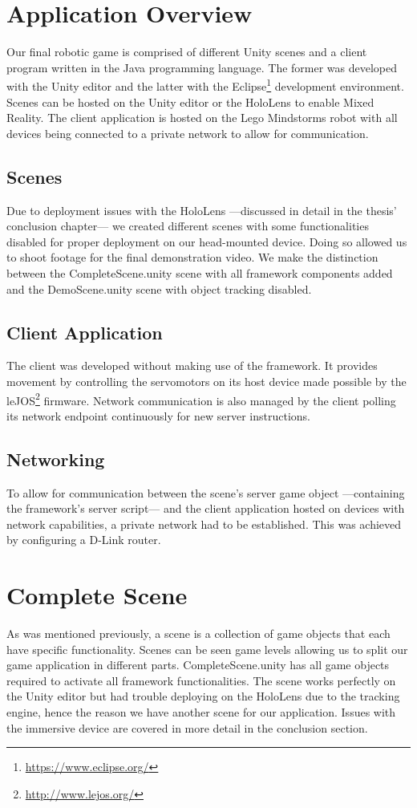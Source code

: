 \newpage
\section{Application Overview}
Our final robotic game is comprised of different Unity scenes and a client program written in the Java programming language. The former was developed with the Unity editor and the latter with the Eclipse\footnote{\protect\url{https://www.eclipse.org/}} development environment. Scenes can be hosted on the Unity editor or the HoloLens to enable Mixed Reality. The client application is hosted on the Lego Mindstorms robot with all devices being connected to a private network to allow for communication.

\subsection{Scenes}
Due to deployment issues with the HoloLens ---discussed in detail in the thesis' conclusion chapter--- we created different scenes with some functionalities disabled for proper deployment on our head-mounted device. Doing so allowed us to shoot footage for the final demonstration video. We make the distinction between the CompleteScene.unity scene with all framework components added and the DemoScene.unity scene with object tracking disabled.

\subsection{Client Application}
The client was developed without making use of the framework. It provides movement by controlling the servomotors on its host device made possible by the leJOS\footnote{\protect\url{http://www.lejos.org/}} firmware. Network communication is also managed by the client polling its network endpoint continuously for new server instructions.

\subsection{Networking}
To allow for communication between the scene's server game object ---containing the framework's server script--- and the client application hosted on devices with network capabilities, a private network had to be established. This was achieved by configuring a D-Link router.

\newpage

\section{Complete Scene}
As was mentioned previously, a scene is a collection of game objects that each have specific functionality. Scenes can be seen game levels allowing us to split our game application in different parts. CompleteScene.unity has all game objects required to activate all framework functionalities. The scene works perfectly on the Unity editor but had trouble deploying on the HoloLens due to the tracking engine, hence the reason we have another scene for our application. Issues with the immersive device are covered in more detail in the conclusion section.


